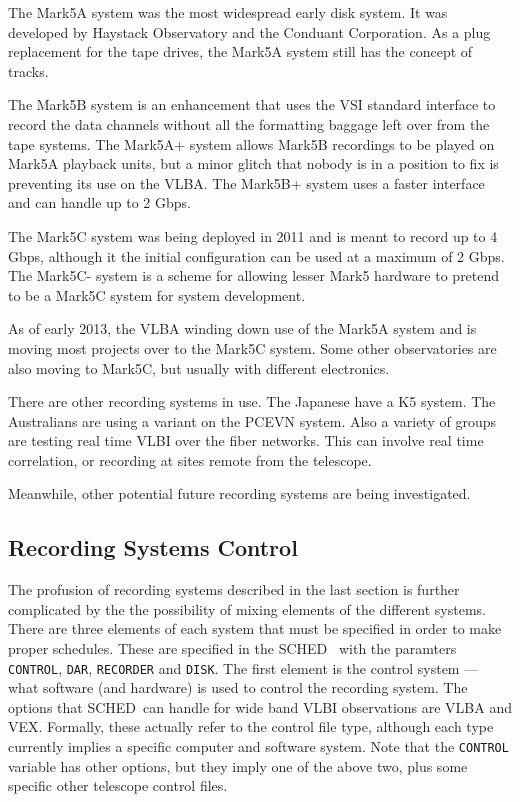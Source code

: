 \documentclass{report}
\newcommand{\schedb}{{\sc SCHED~}}
\begin{document}
The Mark5A system was the most widespread early disk system.  It was
developed by Haystack Observatory and the Conduant Corporation.  As a
plug replacement for the tape drives, the Mark5A system still has the
concept of tracks.  

The Mark5B system is an enhancement that uses the VSI standard
interface to record the data channels without all the formatting
baggage left over from the tape systems.  The Mark5A+ system allows
Mark5B recordings to be played on Mark5A playback units, but a minor
glitch that nobody is in a position to fix is preventing its use on
the VLBA.  The Mark5B+ system uses a faster interface and can handle
up to 2 Gbps.  

The Mark5C system was being deployed in 2011 and is meant to record up
to 4 Gbps, although it the initial configuration can be used at a
maximum of 2 Gbps.  The Mark5C- system is a scheme for allowing lesser
Mark5 hardware to pretend to be a Mark5C system for system
development.  

As of early 2013, the VLBA winding down use of the Mark5A
system and is moving most projects over to the Mark5C system.  Some 
other observatories are also moving to Mark5C, but usually with
different electronics.

There are other recording systems in use.  The Japanese have a K5
system.  The Australians are using a variant on the PCEVN system.
Also a variety of groups are testing real time VLBI over the fiber
networks.  This can involve real time correlation, or recording at
sites remote from the telescope.

Meanwhile, other potential future recording systems are being
investigated.


\subsection{\label{SSEC:RECCONTROL}Recording Systems Control}

The profusion of recording systems described in the last section is
further complicated by the the possibility of mixing elements of the
different systems.  There are three elements of each system that must
be specified in order to make proper schedules.  These are specified
in the \schedb {} with the
paramters {\tt CONTROL}, {\tt DAR}, {\tt RECORDER} and {\tt DISK}.
The first element is the control system --- what software (and
hardware) is used to control the recording system.  The options that
\schedb can handle for wide band VLBI observations are VLBA and VEX.
Formally, these actually refer to the control file type, although each
type currently implies a specific computer and software system.  Note
that the {\tt CONTROL} variable has other options, but they imply one
of the above two, plus some specific other telescope control files.
\end{document}
